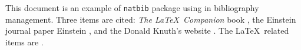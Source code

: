 \documentclass{article}
\begin{document}
This document is an example of \texttt{natbib} package using in bibliography management. Three items are cited: \textit{The \LaTeX\ Companion} book \citep{companion}, the Einstein journal paper Einstein \citet{einstein}, and the Donald Knuth's website \citep{knuthwebsite}. The \LaTeX\ related items are \citep{companion, knuthwebsite}.



\end{document}
